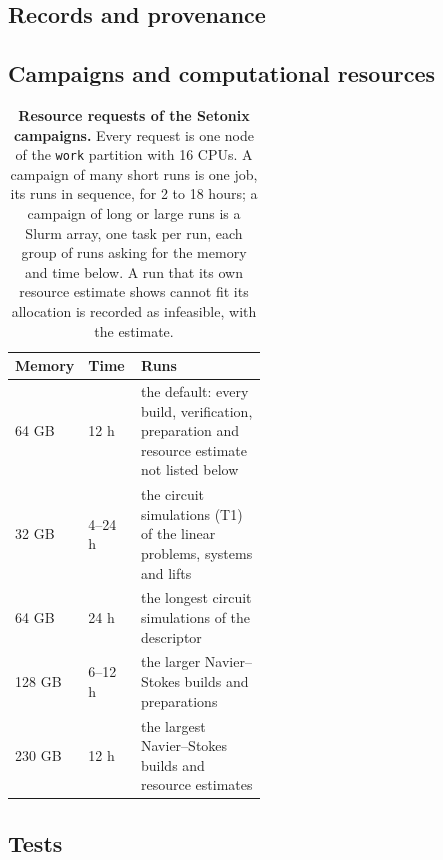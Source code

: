 \subsection{Records and provenance}
\label{app:software-records}

\subsection{Campaigns and computational resources}
\label{app:software-campaigns}

\begin{table}[htbp]
    \centering
    \caption[Resource requests of the Setonix campaigns]{\textbf{Resource requests of the Setonix campaigns.} Every request is one node of the \texttt{work} partition with 16 CPUs. A campaign of many short runs is one job, its runs in sequence, for 2 to 18 hours; a campaign of long or large runs is a Slurm array, one task per run, each group of runs asking for the memory and time below. A run that its own resource estimate shows cannot fit its allocation is recorded as infeasible, with the estimate.}
    \label{tab:resource-classes}
    \small
    \begin{tabular}{@{}l l p{0.5\linewidth}@{}}
        \toprule
        Memory & Time & Runs \\
        \midrule
        64 GB & 12 h & the default: every build, verification, preparation and resource estimate not listed below \\
        32 GB & 4--24 h & the circuit simulations (T1) of the linear problems, systems and lifts \\
        64 GB & 24 h & the longest circuit simulations of the descriptor \\
        128 GB & 6--12 h & the larger Navier--Stokes builds and preparations \\
        230 GB & 12 h & the largest Navier--Stokes builds and resource estimates \\
        \bottomrule
    \end{tabular}
\end{table}

\subsection{Tests}
\label{app:software-tests}


